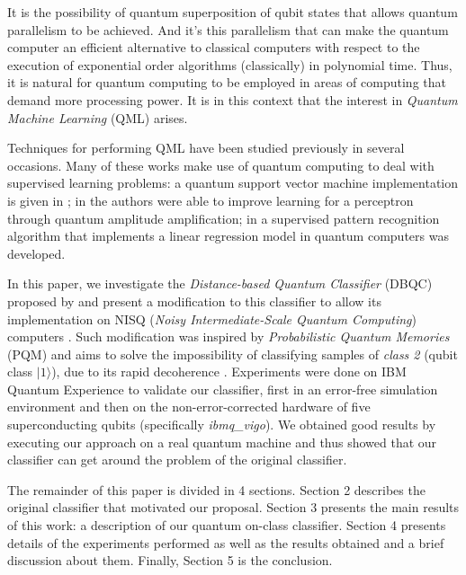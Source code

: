 \documentclass{esannV2}
\begin{document}
It is the possibility of quantum superposition of qubit states that allows quantum parallelism to be achieved. And it's this parallelism that can make the quantum computer an efficient alternative to classical computers with respect to the execution of exponential order algorithms (classically) in polynomial time. Thus, it is natural for quantum computing to be employed in areas of computing that demand more processing power. It is in this context that the interest in \textit{Quantum Machine Learning} (QML) arises.

Techniques for performing QML have been studied previously in several occasions. Many of these works make use of quantum computing to deal with supervised learning problems: a quantum support vector machine implementation is given in \cite{rebentrost2014quantum}; in \cite{kapoor2016quantum} the authors were able to improve learning for a perceptron through quantum amplitude amplification; in \cite{schuld2016prediction} a supervised pattern recognition algorithm that implements a linear regression model in quantum computers was developed.

In this paper, we investigate the \textit{Distance-based Quantum Classifier} (DBQC) proposed by \cite{schuld2017implementing} and present a modification to this classifier to allow its implementation on NISQ (\textit{Noisy Intermediate-Scale Quantum Computing}) computers \cite{Preskill2018quantumcomputingin}. Such modification was inspired by \textit{Probabilistic Quantum Memories} (PQM) \cite{trugenberger2001probabilistic} and aims to solve the impossibility of classifying samples of \textit{class 2} (qubit class $|1\rangle$), due to its rapid decoherence \cite{schuld2017implementing}. Experiments were done on IBM Quantum Experience \cite{ibmq} to validate our classifier, first in an error-free simulation environment and then on the non-error-corrected hardware of five superconducting qubits (specifically \textit{ibmq\_vigo}). We obtained good results by executing our approach on a real quantum machine and thus showed that our classifier can get around the problem of the original classifier.

The remainder of this paper is divided in 4 sections. Section 2 describes the original classifier that motivated our proposal. Section 3 presents the main results of this work: a description of our quantum on-class classifier. Section 4 presents details of the experiments performed as well as the results obtained and a brief discussion about them. Finally, Section 5 is the conclusion.
\end{document}
